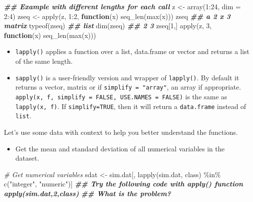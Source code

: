 \documentclass[
  12pt,
]{krantz}
\makeatletter
\newenvironment{Shaded}{\begin{snugshade}}{\end{snugshade}}
\newcommand{\AttributeTok}[1]{\textcolor[rgb]{0.61,0.61,0.61}{#1}}
\newcommand{\CommentTok}[1]{\textcolor[rgb]{0.37,0.37,0.37}{\textit{#1}}}
\newcommand{\ControlFlowTok}[1]{\textcolor[rgb]{0.27,0.27,0.27}{\textbf{#1}}}
\newcommand{\DecValTok}[1]{\textcolor[rgb]{0.06,0.06,0.06}{#1}}
\newcommand{\DocumentationTok}[1]{\textcolor[rgb]{0.37,0.37,0.37}{\textbf{\textit{#1}}}}
\newcommand{\FunctionTok}[1]{\textcolor[rgb]{0,0,0}{#1}}
\newcommand{\NormalTok}[1]{#1}
\newcommand{\OtherTok}[1]{\textcolor[rgb]{0.37,0.37,0.37}{#1}}
\newcommand{\SpecialCharTok}[1]{\textcolor[rgb]{0,0,0}{#1}}
\newcommand{\StringTok}[1]{\textcolor[rgb]{0.5,0.5,0.5}{#1}}
\providecommand{\tightlist}{%
  \setlength{\itemsep}{0pt}\setlength{\parskip}{0pt}}
\newenvironment{kframe}{%
\medskip{}
\setlength{\fboxsep}{.8em}
 \def\at@end@of@kframe{}%
 \ifinner\ifhmode%
  \def\at@end@of@kframe{\end{minipage}}%
  \begin{minipage}{\columnwidth}%
 \fi\fi%
 \def\FrameCommand##1{\hskip\@totalleftmargin \hskip-\fboxsep
 \colorbox{shadecolor}{##1}\hskip-\fboxsep
     \hskip-\linewidth \hskip-\@totalleftmargin \hskip\columnwidth}%
 \MakeFramed {\advance\hsize-\width
   \@totalleftmargin\z@ \linewidth\hsize
   \@setminipage}}%
 {\par\unskip\endMakeFramed%
 \at@end@of@kframe}
\renewenvironment{Shaded}{\begin{kframe}}{\end{kframe}}
\makeatother
\begin{document}
\begin{Shaded}
\begin{Highlighting}[]
\DocumentationTok{\#\# Example with different lengths for each call}
\NormalTok{z }\OtherTok{\textless{}{-}} \FunctionTok{array}\NormalTok{(}\DecValTok{1}\SpecialCharTok{:}\DecValTok{24}\NormalTok{, }\AttributeTok{dim =} \DecValTok{2}\SpecialCharTok{:}\DecValTok{4}\NormalTok{)}
\NormalTok{zseq }\OtherTok{\textless{}{-}} \FunctionTok{apply}\NormalTok{(z, }\DecValTok{1}\SpecialCharTok{:}\DecValTok{2}\NormalTok{, }\ControlFlowTok{function}\NormalTok{(x) }\FunctionTok{seq\_len}\NormalTok{(}\FunctionTok{max}\NormalTok{(x)))}
\NormalTok{zseq         }\DocumentationTok{\#\# a 2 x 3 matrix}
\FunctionTok{typeof}\NormalTok{(zseq) }\DocumentationTok{\#\# list}
\FunctionTok{dim}\NormalTok{(zseq) }\DocumentationTok{\#\# 2 3}
\NormalTok{zseq[}\DecValTok{1}\NormalTok{,]}
\FunctionTok{apply}\NormalTok{(z, }\DecValTok{3}\NormalTok{, }\ControlFlowTok{function}\NormalTok{(x) }\FunctionTok{seq\_len}\NormalTok{(}\FunctionTok{max}\NormalTok{(x)))}
\end{Highlighting}
\end{Shaded}

\begin{itemize}
\tightlist
\item
  \texttt{lapply()} applies a function over a list, data.frame or vector and returns a list of the same length.
\item
  \texttt{sapply()} is a user-friendly version and wrapper of \texttt{lapply()}. By default it returns a vector, matrix or if \texttt{simplify\ =\ "array"}, an array if appropriate. \texttt{apply(x,\ f,\ simplify\ =\ FALSE,\ USE.NAMES\ =\ FALSE)} is the same as \texttt{lapply(x,\ f)}. If \texttt{simplify=TRUE}, then it will return a \texttt{data.frame} instead of \texttt{list}.
\end{itemize}

Let's use some data with context to help you better understand the functions.

\begin{itemize}
\tightlist
\item
  Get the mean and standard deviation of all numerical variables in the dataset.
\end{itemize}

\begin{Shaded}
\begin{Highlighting}[]
\CommentTok{\# Get numerical variables}
\NormalTok{sdat }\OtherTok{\textless{}{-}}\NormalTok{ sim.dat[, }\FunctionTok{lapply}\NormalTok{(sim.dat, class) }\SpecialCharTok{\%in\%} \FunctionTok{c}\NormalTok{(}\StringTok{"integer"}\NormalTok{, }\StringTok{"numeric"}\NormalTok{)]}
\DocumentationTok{\#\# Try the following code with apply() function apply(sim.dat,2,class)}
\DocumentationTok{\#\# What is the problem?}
\end{Highlighting}
\end{Shaded}
\end{document}
